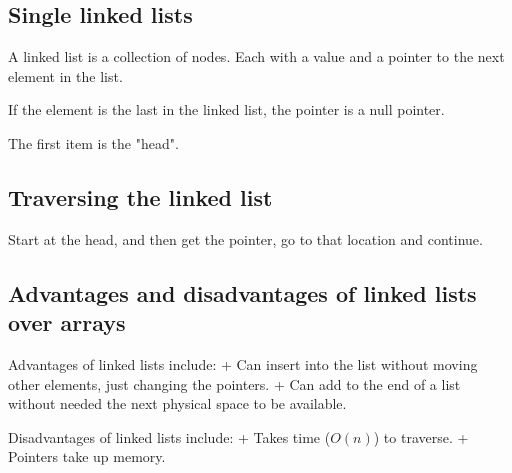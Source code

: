 
\subsection{Single linked lists}

A linked list is a collection of nodes. Each with a value and a pointer to the next element in the list.

If the element is the last in the linked list, the pointer is a null pointer.

The first item is the "head".

\subsection{Traversing the linked list}

Start at the head, and then get the pointer, go to that location and continue.

\subsection{Advantages and disadvantages of linked lists over arrays}

Advantages of linked lists include:
+ Can insert into the list without moving other elements, just changing the pointers.
+ Can add to the end of a list without needed the next physical space to be available.


Disadvantages of linked lists include:
+ Takes time (\(O(n)\)) to traverse.
+ Pointers take up memory.


